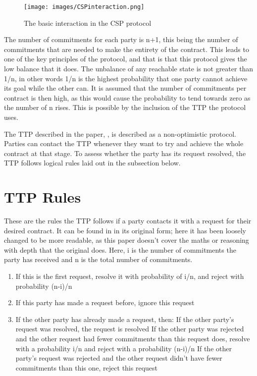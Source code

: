 \documentclass{l4proj}
\begin{document}



\begin{figure}[ht!]
\centering
\texttt{[image: images/CSPinteraction.png]}
\caption{The basic interaction in the CSP protocol}
\label{csp}
\end{figure}

The number of commitments for each party is n+1, this being the number of commitments that are needed to make the entirety of the contract. This leads to one of the key principles of the protocol, and that is that this protocol gives the low balance that it does. The unbalance of any reachable state is not greater than 1/n, in other words 1/n is the highest probability that one party cannot achieve its goal while the other can. It is assumed that the number of commitments per contract is then high, as this would cause the probability to tend towards zero as the number of n rises. This is possible by the inclusion of the TTP the protocol uses.

The TTP described in the paper, \cite{ASW09}, is described as a non-optimistic protocol. Parties can contact the TTP whenever they want to try and achieve the whole contract at that stage. To assess whether the party has its request resolved, the TTP follows logical rules laid out in the subsection below.

\section{TTP Rules}
These are the rules the TTP follows if a party contacts it with a request for their desired contract. It can be found in \cite{ASW09} in its original form; here it has been loosely changed to be more readable, as this paper doesn't cover the maths or reasoning with depth that the original does. Here, i is the number of commitments the party has received and n is the total number of commitments.

\begin{enumerate}
\item If this is the first request, resolve it with probability of i/n, and reject with probability (n-i)/n
\item If this party has made a request before, ignore this request
\item If the other party has already made a request, then:
\subitem If the other party's request was resolved, the request is resolved
\subitem If the other party was rejected and the other request had fewer commitments than this request does, resolve with a probability i/n and reject with a probability (n-i)/n
\subitem If the other party's request was rejected and the other request didn't have fewer commitments than this one, reject this request
\end{enumerate}
\end{document}
